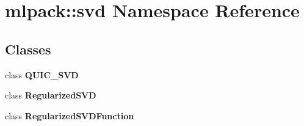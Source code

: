 \section{mlpack\-:\-:svd Namespace Reference}
\label{namespacemlpack_1_1svd}
\subsection*{Classes}
\begin{DoxyCompactItemize}
\item 
class {\bf Q\-U\-I\-C\-\_\-\-S\-V\-D}
\item 
class {\bf Regularized\-S\-V\-D}
\item 
class {\bf Regularized\-S\-V\-D\-Function}
\end{DoxyCompactItemize}

